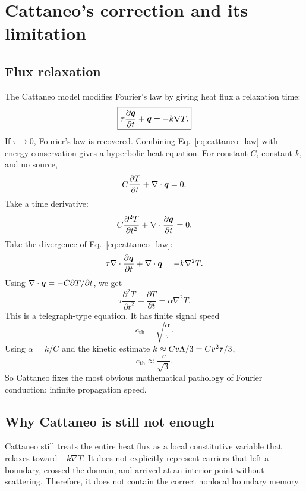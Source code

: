 \documentclass[11pt]{article}
\begin{document}
\section{Cattaneo's correction and its limitation}
\subsection{Flux relaxation}
The Cattaneo model modifies Fourier's law by giving heat flux a relaxation time:
\begin{equation}
    \boxed{\tau\frac{\partial \bm{q}}{\partial t}+\bm{q}=-k\nabla T.}
    \label{eq:cattaneo_law}
\end{equation}
If \(\tau\to 0\), Fourier's law is recovered. Combining Eq.~\eqref{eq:cattaneo_law} with energy conservation gives a hyperbolic heat equation. For constant \(C\), constant \(k\), and no source,
\begin{equation}
    C\frac{\partial T}{\partial t}+\nabla\cdot\bm{q}=0.
\end{equation}
Take a time derivative:
\begin{equation}
    C\frac{\partial^2T}{\partial t^2}+\nabla\cdot\frac{\partial\bm{q}}{\partial t}=0.
\end{equation}
Take the divergence of Eq.~\eqref{eq:cattaneo_law}:
\begin{equation}
    \tau\nabla\cdot\frac{\partial\bm{q}}{\partial t}+\nabla\cdot\bm{q}=-k\nabla^2T.
\end{equation}
Using \(\nabla\cdot\bm{q}=-C\partial T/\partial t\), we get
\begin{equation}
    \boxed{\tau\frac{\partial^2T}{\partial t^2}+\frac{\partial T}{\partial t}=\alpha\nabla^2T.}
    \label{eq:cattaneo_heat_equation}
\end{equation}
This is a telegraph-type equation. It has finite signal speed
\begin{equation}
    c_{\mathrm{th}}=\sqrt{\frac{\alpha}{\tau}}.
\end{equation}
Using \(\alpha=k/C\) and the kinetic estimate \(k\approx C v\Lambda/3=Cv^2\tau/3\),
\begin{equation}
    c_{\mathrm{th}}\approx \frac{v}{\sqrt{3}}.
\end{equation}
So Cattaneo fixes the most obvious mathematical pathology of Fourier conduction: infinite propagation speed.

\subsection{Why Cattaneo is still not enough}
Cattaneo still treats the entire heat flux as a local constitutive variable that relaxes toward \(-k\nabla T\). It does not explicitly represent carriers that left a boundary, crossed the domain, and arrived at an interior point without scattering. Therefore, it does not contain the correct nonlocal boundary memory.
\end{document}
